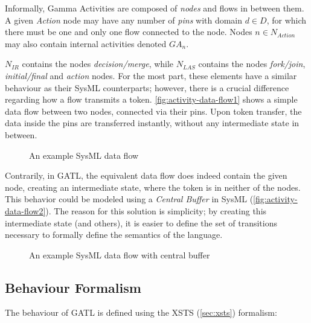 \begin{definition}
Informally, Gamma Activities are composed of \emph{nodes} and flows in between them. A given  \emph{Action} node may have any number of \emph{pins} with domain \(d \in D\), for which there must be one and only one flow connected to the node. Nodes \(n \in N_\mathit{Action}\) may also contain internal activities denoted \(\mathit{GA}_\mathit{n}\).

\(N_\mathit{IR}\) contains the nodes \emph{decision/merge}, while \(N_\mathit{LAS}\) contains the nodes \emph{fork/join}, \emph{initial/final} and \emph{action} nodes. For the most part, these elements have a similar behaviour as their SysML counterparts; however, there is a crucial difference regarding how a flow transmits a token. \autoref{fig:activity-data-flow1} shows a simple data flow between two nodes, connected via their pins. Upon token transfer, the data inside the pins are transferred instantly, without any intermediate state in between. 

\begin{figure}[!ht]
	\centering
	
	\caption{An example SysML data flow}
	\label{fig:activity-data-flow1}
\end{figure}

Contrarily, in GATL, the equivalent data flow does indeed contain the given node, creating an intermediate state, where the token is in neither of the nodes. This behavior could be modeled using a \emph{Central Buffer} in SysML (\autoref{fig:activity-data-flow2}). The reason for this solution is simplicity; by creating this intermediate state (and others), it is easier to define the set of transitions necessary to formally define the semantics of the language.

\begin{figure}[!ht]
	\centering
	
	\caption{An example SysML data flow with central buffer}
	\label{fig:activity-data-flow2}
\end{figure}
	
\end{definition}\label{def:activity-structure}

\subsection{Behaviour Formalism}

The behaviour of GATL is defined using the XSTS (\autoref{sec:xsts}) formalism:

